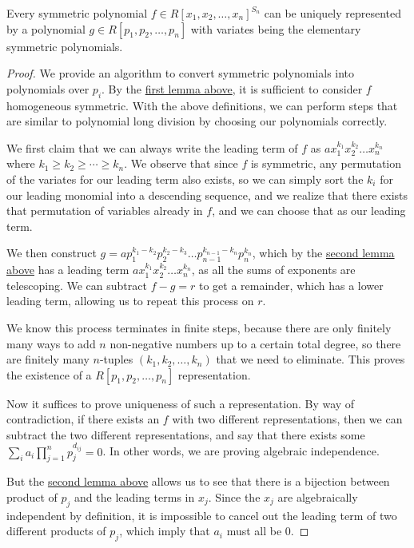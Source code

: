 \begin{theorem}\label{thm:fundamental-sym-polynomial}
    Every symmetric polynomial \(f \in {R[x_1,x_2,\hdots,x_n]}^{S_n}\)
    can be uniquely represented by a polynomial \(g \in R[p_1,p_2,\hdots,p_n]\)
    with variates being the elementary symmetric polynomials.
\end{theorem}
\begin{proof}
    We provide an algorithm to convert symmetric polynomials
    into polynomials over \(p_i\).
    By the \hyperref[lem:homogeneous-sym-polynomial]{first lemma above},
    it is sufficient to consider \(f\) homogeneous symmetric.
    With the above definitions,
    we can perform steps that are similar to polynomial long division
    by choosing our polynomials correctly.

    We first claim that we can always write the leading term of \(f\)
    as \(ax_1^{k_1}x_2^{k_2} \hdots x_n^{k_n}\)
    where \(k_1 \geq k_2 \geq \cdots \geq k_n\).
    We observe that since \(f\) is symmetric,
    any permutation of the variates for our leading term also exists,
    so we can simply sort the \(k_i\) for our leading monomial
    into a descending sequence,
    and we realize that there exists that permutation of variables
    already in \(f\),
    and we can choose that as our leading term.

    We then construct \(g = ap_1^{k_1-k_2}p_2^{k_2-k_3} \hdots
    p_{n-1}^{k_{n-1}-k_n}p_n^{k_n}\),
    which by the \hyperref[lem:leading-term-sym-polynomial]{second lemma above}
    has a leading term \(ax_1^{k_1}x_2^{k_2} \hdots x_n^{k_n}\),
    as all the sums of exponents are telescoping.
    We can subtract \(f-g = r\) to get a remainder,
    which has a lower leading term,
    allowing us to repeat this process on \(r\).

    We know this process terminates in finite steps,
    because there are only finitely many ways to add \(n\) non-negative numbers
    up to a certain total degree,
    so there are finitely many \(n\)-tuples \((k_1,k_2,\hdots,k_n)\)
    that we need to eliminate.
    This proves the existence of a \(R[p_1,p_2,\hdots,p_n]\) representation.

    \medskip

    Now it suffices to prove uniqueness of such a representation.
    By way of contradiction,
    if there exists an \(f\) with two different representations,
    then we can subtract the two different representations,
    and say that there exists some \(\sum_i a_i \prod_{j=1}^n p_j^{d_{ij}} = 0\).
    In other words, we are proving algebraic independence.

    But the \hyperref[lem:leading-term-sym-polynomial]{second lemma above}
    allows us to see that there is a bijection between product of \(p_j\)
    and the leading terms in \(x_j\).
    Since the \(x_j\) are algebraically independent by definition,
    it is impossible to cancel out the leading term
    of two different products of \(p_j\),
    which imply that \(a_i\) must all be 0.
\end{proof}
